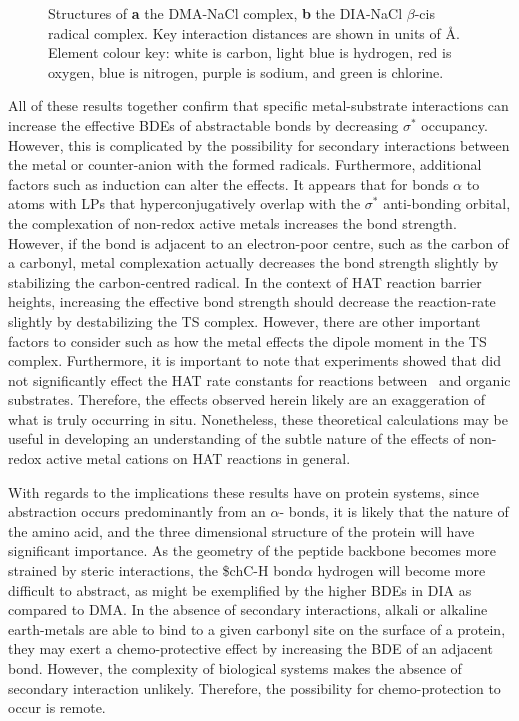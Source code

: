 \begin{doublespace}
\begin{figure}[!htbp]
  \caption[Structures of the DIA-NaCl complex and radical complex.]{Structures
  of \textbf{a} the DMA-NaCl complex, \textbf{b} the DIA-NaCl $\beta$-cis
  radical complex. Key interaction distances are shown in units of \AA. Element
  colour key: white is carbon, light blue is hydrogen, red is oxygen, blue is
  nitrogen, purple is sodium, and green is chlorine.} \label{fig:dia-na-cl}
\end{figure}

All of these results together confirm that specific metal-substrate interactions
can increase the effective BDEs of abstractable  bonds by decreasing
 $\sigma^*$ occupancy. However, this is complicated by the possibility
for secondary interactions between the metal or counter-anion with the formed
radicals. Furthermore, additional factors such as induction can alter the
effects. It appears that for  bonds $\alpha$ to atoms with LPs that
hyperconjugatively overlap with the  $\sigma^*$ anti-bonding orbital,
the complexation of non-redox active metals increases the  bond
strength. However, if the  bond is adjacent to an electron-poor centre,
such as the carbon of a carbonyl, metal complexation actually decreases the bond
strength slightly by stabilizing the carbon-centred radical. In the context of
HAT reaction barrier heights, increasing the effective  bond strength
should decrease the reaction-rate slightly by destabilizing the TS complex.
However, there are other important factors to consider such as how the metal
effects the dipole moment in the TS complex. Furthermore, it is important to
note that experiments showed that  did not significantly effect the
HAT rate constants for reactions between \cumo\ and organic substrates.
Therefore, the effects observed herein likely are an exaggeration of what is
truly occurring in situ. Nonetheless, these theoretical calculations may be
useful in developing an understanding of the subtle nature of the effects of
non-redox active metal cations on HAT reactions in general.

With regards to the implications these results have on protein systems, since
abstraction occurs predominantly from an $\alpha$- bonds, it is likely
that the nature of the amino acid, and the three dimensional structure of the
protein will have significant importance. As the geometry of the peptide
backbone becomes more strained by steric interactions, the \$ch{C-H}
bond$\alpha$ hydrogen will become more difficult to abstract, as might be
exemplified by the higher  BDEs in DIA as compared to DMA. In the
absence of secondary interactions, alkali or alkaline earth-metals are able to
bind to a given carbonyl site on the surface of a protein, they may exert a
chemo-protective effect by increasing the BDE of an adjacent  bond.
However, the complexity of biological systems makes the absence of secondary
interaction unlikely. Therefore, the possibility for chemo-protection to occur
is remote.


\end{doublespace}
